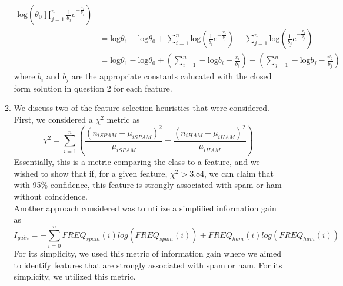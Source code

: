 \documentclass{article}
\begin{document}
\begin{enumerate}
\begin{enumerate}
\begin{align*}
                        \text{log} \left( \theta_0 \prod\limits_{j=1}^n
                            \frac{1}{b_j} e^{-\frac{x_i}{b_j}} \right) \\
                    &= \text{log} \theta_1 - \text{log} \theta_0 +
                        \sum\limits_{i=1}^n \text{log} \left( \frac{1}{b_i} 
                            e^{-\frac{x_i}{b_i}} \right) -
                        \sum\limits_{j=1}^n \text{log} \left( \frac{1}{b_j}
                            e^{-\frac{x_i}{b_j}} \right) \\
                    &=  \text{log} \theta_1 - \text{log} \theta_0 +
                        \left( \sum\limits_{i=1}^n -\text{log} b_i - 
                            \frac{x_i}{b_i} \right)
                         - \left( \sum\limits_{j=1}^n - \text{log} b_j - 
                            \frac{x_j}{b_j} \right)
                \end{align*}
                where \(b_i\) and \(b_j\) are the appropriate constants
                calucated with the closed form solution in question 2 for
                each feature.
            \item %
              We discuss two of the feature selection heuristics that were 
              considered. First, we considered a \(\chi^2\) metric as
              \begin{equation*}
                \chi^2 = \sum_{i=1}^n \left(\frac{(n_{iSPAM} 
                  - \mu_{iSPAM})^2}{\mu_{iSPAM}} +
                \frac{(n_{iHAM} 
                  - \mu_{iHAM})^2}{\mu_{iHAM}}\right)
              \end{equation*}
              Essentially, this is a metric comparing the class to a feature,
              and we wished to show that if, for a given feature, 
              \(\chi^2 > 3.84\), we can claim that with 95\% confidence, this
              feature is strongly associated with spam or ham without 
              coincidence. \\
              Another approach considered was to utilize a simplified 
              information gain as
              \begin{equation*}
                I_{gain} = -\sum_{i=0}^n FREQ_{spam}(i)log(FREQ_{spam}(i)) +
                FREQ_{ham}(i)log(FREQ_{ham}(i))
              \end{equation*}
              For its simplicity, we used this metric of information gain where
              we aimed to identify features that are strongly associated with
              spam or ham. For its simplicity, we utilized this metric. 
        \end{enumerate}
\end{enumerate}
\end{document}
